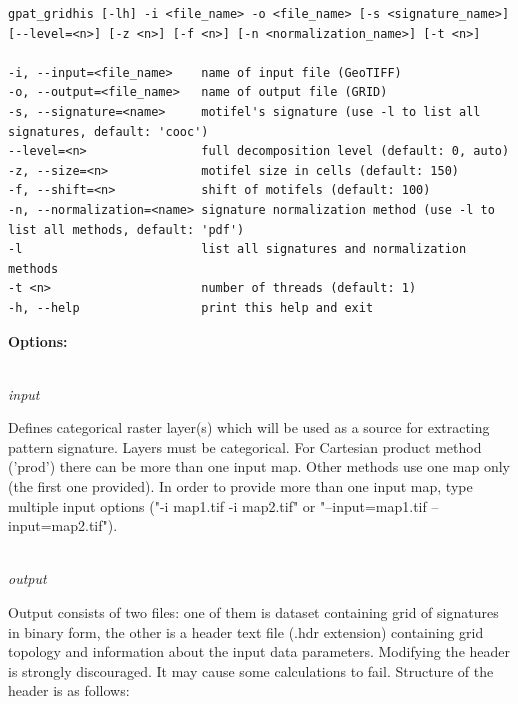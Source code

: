 \documentclass[12pt,margin=0.5in]{article}
\newcommand{\newoption}[1]{\mbox{}\\{\it #1}}
\begin{document}
\begin{minipage}{\linewidth}
\begin{lstlisting}
gpat_gridhis [-lh] -i <file_name> -o <file_name> [-s <signature_name>] [--level=<n>] [-z <n>] [-f <n>] [-n <normalization_name>] [-t <n>]

-i, --input=<file_name>    name of input file (GeoTIFF)
-o, --output=<file_name>   name of output file (GRID)
-s, --signature=<name>     motifel's signature (use -l to list all signatures, default: 'cooc')
--level=<n>                full decomposition level (default: 0, auto)
-z, --size=<n>             motifel size in cells (default: 150)
-f, --shift=<n>            shift of motifels (default: 100)
-n, --normalization=<name> signature normalization method (use -l to list all methods, default: 'pdf')
-l                         list all signatures and normalization methods
-t <n>                     number of threads (default: 1)
-h, --help                 print this help and exit
\end{lstlisting}
\end{minipage}

{\bf Options:}

\newoption{input}

Defines categorical raster layer(s) which will be used as a source for extracting pattern signature. Layers must be categorical. For Cartesian product method ('prod') there can be more than one input map. Other methods use one map only (the first one provided). In order to provide more than one input map, type multiple input options ("-i map1.tif -i map2.tif" or "--input=map1.tif --input=map2.tif").

\newoption{output}

Output consists of two files: one of them is dataset containing grid of signatures in binary form, the other is a header text file (.hdr extension) containing grid topology and information about the input data parameters. Modifying the header is strongly discouraged. It may cause some calculations to fail. 
Structure of the header is as follows:\\
\end{document}
